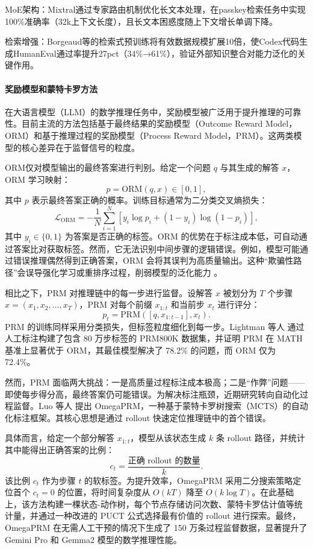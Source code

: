 \documentclass[professional,privacy,print,win,long,STEM,AutoFakeBold]{def/buaa}
\begin{document}
MoE架构：Mixtral通过专家路由机制优化长文本处理，在passkey检索任务中实现100\%准确率（32k上下文长度），且长文本困惑度随上下文增长单调下降。

检索增强：Borgeaud等的检索式预训练将有效数据规模扩展10倍，使Codex代码生成HumanEval通过率提升27pct（34\%→61\%），验证外部知识整合对能力泛化的关键作用。

\paragraph{奖励模型和蒙特卡罗方法}

在大语言模型（LLM）的数学推理任务中，奖励模型被广泛用于提升推理的可靠性。目前主流的方法包括基于最终结果的奖励模型（Outcome Reward Model，ORM）和基于推理过程的奖励模型（Process Reward Model，PRM）。这两类模型的核心差异在于监督信号的粒度。

ORM仅对模型输出的最终答案进行判别。给定一个问题 $q$ 与其生成的解答 $x$，ORM 学习映射：
\[
p = \mathrm{ORM}(q, x) \in [0,1],
\]
其中 $p$ 表示最终答案正确的概率。训练目标通常为二分类交叉熵损失：
\[
\mathcal{L}_{\mathrm{ORM}} = -\frac{1}{N}\sum_{i=1}^N \left[ y_i \log p_i + (1 - y_i)\log(1 - p_i) \right],
\]
其中 $y_i \in \{0,1\}$ 为答案是否正确的标签。ORM 的优势在于标注成本低，可自动通过答案比对获取标签。然而，它无法识别中间步骤的逻辑错误。例如，模型可能通过错误推理偶然得到正确答案，ORM 会将其误判为高质量输出。这种“欺骗性路径”会误导强化学习或重排序过程，削弱模型的泛化能力 。

相比之下，PRM 对推理链中的每一步进行监督。设解答 $x$ 被划分为 $T$ 个步骤 $x = (x_1, x_2, \dots, x_T)$，PRM 对每个前缀 $x_{1:t}$ 和当前步 $x_t$ 进行评分：
\[
p_t = \mathrm{PRM}([q, x_{1:t-1}], x_t).
\]
PRM 的训练同样采用分类损失，但标签粒度细化到每一步。Lightman 等人  通过人工标注构建了包含 80 万步标签的 PRM800K 数据集，并证明 PRM 在 MATH 基准上显著优于 ORM，其最佳模型解决了 78.2\% 的问题，而 ORM 仅为 72.4\%。

然而，PRM 面临两大挑战：一是高质量过程标注成本极高；二是“作弊”问题——即使每步得分高，最终答案仍可能错误。为解决标注瓶颈，近期研究转向自动化过程监督。Luo 等人  提出 OmegaPRM，一种基于蒙特卡罗树搜索（MCTS）的自动化标注框架。其核心思想是通过 rollout 快速定位推理链中的首个错误。

具体而言，给定一个部分解答 $x_{1:t}$，模型从该状态生成 $k$ 条 rollout 路径，并统计其中能得出正确答案的比例：
\[
c_t = \frac{\text{正确 rollout 的数量}}{k}.
\]
该比例 $c_t$ 作为步骤 $t$ 的软标签。为提升效率，OmegaPRM 采用二分搜索策略定位首个 $c_t = 0$ 的位置，将时间复杂度从 $O(kT)$ 降至 $O(k \log T)$。在此基础上，该方法构建一棵状态-动作树，每个节点存储访问次数、蒙特卡罗估计值等统计量，并通过一种改进的 PUCT 公式选择最有价值的 rollout 进行探索。最终，OmegaPRM 在无需人工干预的情况下生成了 150 万条过程监督数据，显著提升了 Gemini Pro 和 Gemma2 模型的数学推理性能。
\end{document}

